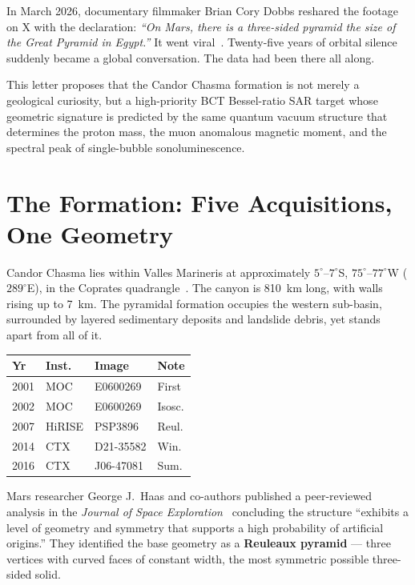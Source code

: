 \documentclass[12pt,twocolumn]{article}
\begin{document}
In March 2026, documentary filmmaker Brian Cory Dobbs reshared the
footage on X with the declaration: \textit{``On Mars, there is a
three-sided pyramid the size of the Great Pyramid in Egypt.''} It
went viral~\cite{Dobbs2026}. Twenty-five years of orbital silence
suddenly became a global conversation. The data had been there all along.

This letter proposes that the Candor Chasma formation is not merely
a geological curiosity, but a high-priority BCT Bessel-ratio SAR
target whose geometric signature is predicted by the same quantum
vacuum structure that determines the proton mass, the muon anomalous
magnetic moment, and the spectral peak of single-bubble
sonoluminescence.

\section{The Formation: Five Acquisitions, One Geometry}

Candor Chasma lies within Valles Marineris at approximately
$5^\circ$--$7^\circ$S, $75^\circ$--$77^\circ$W ($289^\circ$E),
in the Coprates quadrangle~\cite{Marspedia}. The canyon is 810~km
long, with walls rising up to 7~km. The pyramidal formation occupies
the western sub-basin, surrounded by layered sedimentary deposits
and landslide debris, yet stands apart from all of it.

\begin{center}
{\footnotesize
\begin{tabular}{@{}llll@{}}
\toprule
Yr & Inst. & Image & Note \\
\midrule
2001 & MOC & E0600269 & First \\
2002 & MOC & E0600269 & Isosc.\\
2007 & HiRISE & PSP3896 & Reul. \\
2014 & CTX & D21-35582 & Win. \\
2016 & CTX & J06-47081 & Sum. \\
\bottomrule
\end{tabular}}
\end{center}

\medskip
Mars researcher George J.\ Haas and co-authors published a
peer-reviewed analysis in the \textit{Journal of Space
Exploration}~\cite{Haas2017} concluding the structure ``exhibits
a level of geometry and symmetry that supports a high probability
of artificial origins.'' They identified the base geometry as a
\textbf{Reuleaux pyramid} --- three vertices with curved faces of
constant width, the most symmetric possible three-sided solid.
\end{document}
